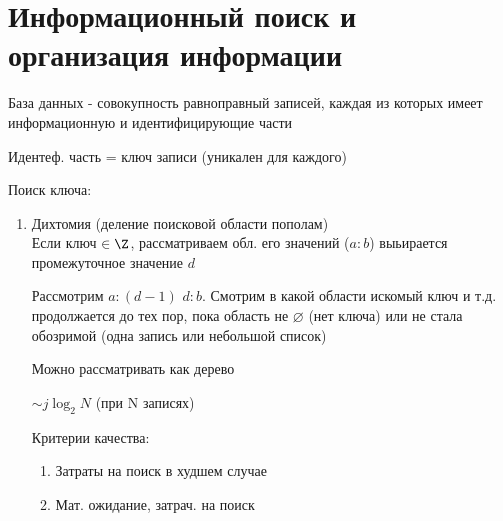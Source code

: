 \documentclass[discrete.tex]{subfiles}
\begin{document}
  \section{Информационный поиск и организация информации}

  \begin{definition}
    База данных - совокупность равноправный записей, каждая из которых имеет информационную и идентифицирующие части

    Идентеф. часть = ключ записи (уникален для каждого)
  \end{definition}

  Поиск ключа:
  \begin{enumerate}
    \item Дихтомия (деление поисковой области пополам)\\
    Если ключ $\in \Z$, рассматриваем обл. его значений ($a:b$) выьирается промежуточное значение $d$

    Рассмотрим $a:(d-1)$ $d:b$. Смотрим в какой области искомый ключ и т.д. продолжается до тех пор, пока область не $\varnothing$ (нет ключа) или не стала обозримой (одна запись или небольшой список)

    Можно рассматривать как дерево

    $\sim j \log_2 N$ (при N записях)

    Критерии качества:
    \begin{enumerate}
      \item Затраты на поиск в худшем случае
      \item Мат. ожидание, затрач. на поиск
    \end{enumerate}
  \end{enumerate}
\end{document}
